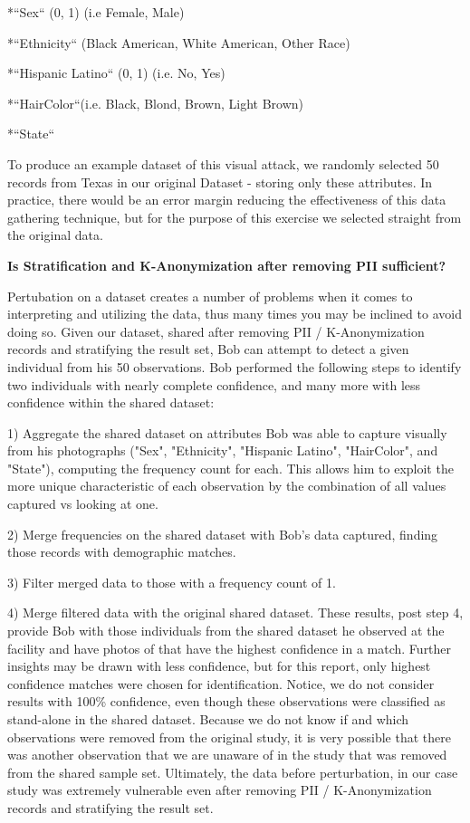 \documentclass[10pt,journal,compsoc]{IEEEtran}
\begin{document}
		*``Sex`` (0, 1) (i.e Female, Male)
		
		*``Ethnicity`` (Black American, White American, Other Race)
		
		*``Hispanic Latino`` (0, 1) (i.e. No, Yes)
		
		*``HairColor``(i.e. Black, Blond, Brown, Light Brown)
		
		*``State``
		
To produce an example dataset of this visual attack, we randomly selected 50 records from Texas in our original Dataset - storing only these attributes. In practice, there would be an error margin reducing the effectiveness of this data gathering technique, but for the purpose of this exercise we selected straight from the original data.   \linebreak


\noindent \textbf {Is Stratification and K-Anonymization after removing PII sufficient?}

Pertubation on a dataset creates a number of problems when it comes to interpreting and utilizing the data, thus many times you may be inclined to avoid doing so. Given our dataset, shared after removing PII / K-Anonymization records and stratifying the result set, Bob can attempt to detect a given individual from his 50 observations. Bob performed the following steps to identify two individuals with nearly complete confidence, and many more with less confidence within the shared dataset:

1) Aggregate the shared dataset on attributes Bob was able to capture visually from his photographs ("Sex", "Ethnicity", "Hispanic Latino", "HairColor", and "State"), computing the frequency count for each. This allows him to exploit the more unique characteristic of each observation by the combination of all values captured vs looking at one.

2) Merge frequencies on the shared dataset with Bob’s data captured, finding those records with demographic matches.

3) Filter merged data to those with a frequency count of 1.

4) Merge filtered data with the original shared dataset.
These results, post step 4, provide Bob with those individuals from the shared dataset he observed at the facility and have photos of that have the highest confidence in a match. Further insights may be drawn with less confidence, but for this report, only highest confidence matches were chosen for identification. Notice, we do not consider results with 100\% confidence, even though these observations were classified as stand-alone in the shared dataset. Because we do not know if and which observations were removed from the original study, it is very possible that there was another observation that we are unaware of in the study that was removed from the shared sample set. Ultimately, the data before perturbation, in our case study was extremely vulnerable even after removing PII / K-Anonymization records and stratifying the result set. \linebreak 
\end{document}
